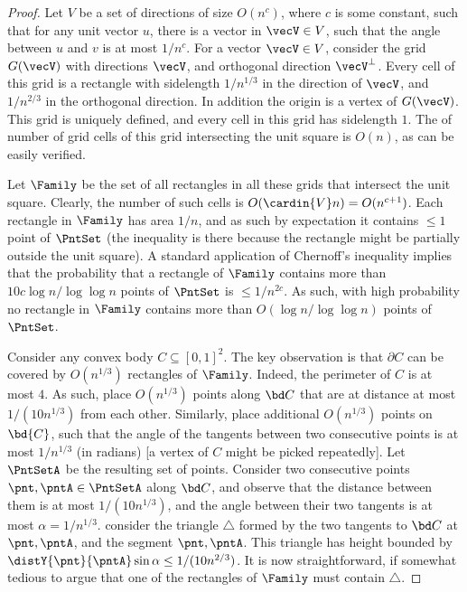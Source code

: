 \begin{proof}
    Let $V$ be a set of directions of size $O(n^{c})$, where $c$ is
    some constant, such that for any unit vector $u$, there is a
    vector in $\vecV \in V$, such that the angle between $u$ and $v$
    is at most $1/n^{c}$. For a vector $\vecV \in V$, consider the
    grid $G(\vecV)$ with directions $\vecV$, and orthogonal direction
    $\vecV^\perp$. Every cell of this grid is a rectangle with
    sidelength $1/n^{1/3}$ in the direction of $\vecV$, and
    $1/n^{2/3}$ in the orthogonal direction. In addition the origin is
    a vertex of $G(\vecV)$. This grid is uniquely defined, and every
    cell in this grid has sidelength $1$. The of number of grid cells
    of this grid intersecting the unit square is $O(n)$, as can be
    easily verified.

    Let $\Family$ be the set of all rectangles in all these grids that
    intersect the unit square. Clearly, the number of such cells is
    $O(\cardin{V} n) = O(n^{c+1})$. Each rectangle in $\Family$ has
    area $1/n$, and as such by expectation it contains $\leq 1$ point
    of $\PntSet$ (the inequality is there because the rectangle might
    be partially outside the unit square). A standard application of
    Chernoff's inequality implies that the probability that a
    rectangle of $\Family$ contains more than
    $10 c \log n/ \log \log n$ points of $\PntSet$ is $\leq
    1/n^{2c}$. As such, with high probability no rectangle in
    $\Family$ contains more than $O( \log n/ \log \log n)$ points of
    $\PntSet$.

    Consider any convex body $C \subseteq [0,1]^2$. The key
    observation is that $\partial{C}$ can be covered by $O(n^{1/3})$
    rectangles of $\Family$. Indeed, the perimeter of $C$ is at most
    $4$. As such, place $O(n^{1/3})$ points along $\bd C$ that are at
    distance at most $1/(10n^{1/3})$ from each other. Similarly, place
    additional $O(n^{1/3})$ points on $\bd{C}$, such that the angle of
    the tangents between two consecutive points is at most $1/n^{1/3}$
    (in radians) [a vertex of $C$ might be picked repeatedly]. Let
    $\PntSetA$ be the resulting set of points.  Consider two
    consecutive points $\pnt,\pntA \in \PntSetA$ along $\bd C$, and
    observe that the distance between them is at most $1/(10n^{1/3})$,
    and the angle between their two tangents is at most
    $\alpha = 1/n^{1/3}$.  consider the triangle $\triangle$ formed by
    the two tangents to $\bd C$ at $\pnt, \pntA$, and the segment
    $\pnt, \pntA$. This triangle has height bounded by
    $\distY{\pnt}{\pntA} \sin \alpha \leq 1/(10n^{2/3})$. It is now
    straightforward, if somewhat tedious to argue that one of the
    rectangles of $\Family$ must contain $\triangle$.


\end{proof}

